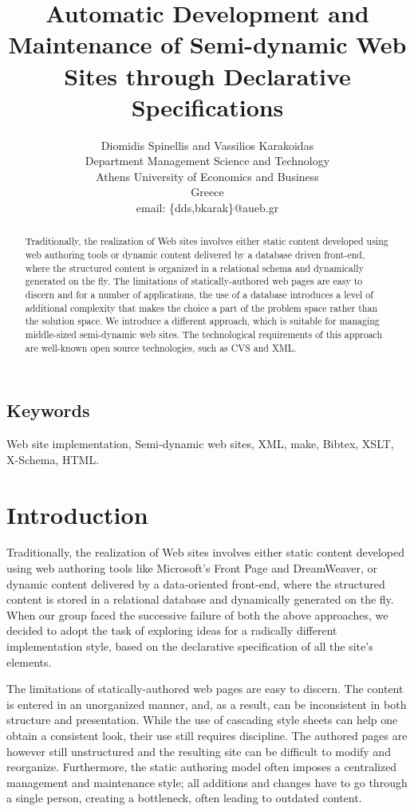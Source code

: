 \documentclass[10pt]{article}
\title{Automatic Development and Maintenance of Semi-dynamic Web Sites through Declarative Specifications}
\author{Diomidis Spinellis and Vassilios Karakoidas\\
Department Management Science and Technology \\
Athens University of Economics and Business \\
Greece\\
email: \{dds,bkarak\}@aueb.gr}
\date{}
\begin{document}
\maketitle

\begin{abstract}
\noindent
Traditionally, the realization of Web sites involves either
static content developed using web authoring tools or dynamic
content delivered by a database driven front-end,
where the structured content is organized
in a relational schema and dynamically generated on the fly.
The limitations of statically-authored web pages are easy to discern and
for a number of applications, the use of a database
introduces a level of additional complexity that
makes the choice a part of the problem space rather than the solution space.
We introduce a different approach, which is suitable for managing 
middle-sized semi-dynamic web sites. The technological requirements of this
approach are well-known open source technologies, such as CVS and XML.
\end{abstract}

\subsection*{Keywords}
Web site implementation, Semi-dynamic web sites, XML, make, Bibtex, XSLT, X-Schema, HTML.

\section{Introduction}
\label{sec:intro}
Traditionally, the realization of Web sites involves either
static content developed using web authoring tools like
Microsoft's Front Page and DreamWeaver, or dynamic
content delivered by a data-oriented front-end,
where the structured content is stored in a relational database 
and dynamically generated on the fly.
When our group faced the successive failure of both the above approaches,
we decided to adopt the task of exploring ideas for a radically different
implementation style, based on the declarative specification
of all the site's elements.

The limitations of statically-authored web pages are easy to discern.
The content is entered in an unorganized manner, and, as a result,
can be inconsistent in both structure and presentation.
While the use of cascading style sheets can help one obtain a
consistent look, their use still requires discipline.
The authored pages are however still unstructured and the resulting
site can be difficult to modify and reorganize.
Furthermore, the static authoring model often imposes a centralized
management and maintenance style;
all additions and changes have to go through a single person,
creating a bottleneck, often leading to outdated content.
\end{document}
